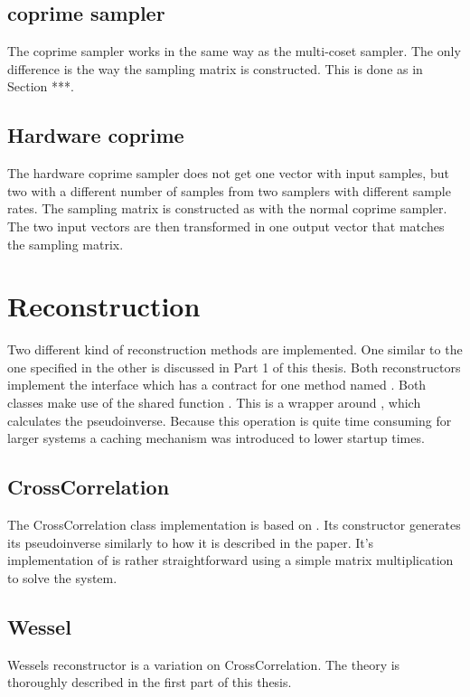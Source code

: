 \documentclass[a4paper, openany, oneside]{memoir}
\begin{document}
\subsection{coprime sampler}
\label{sec:coprime-sampler}
The coprime sampler works in the same way as the multi-coset sampler. The only difference is the way the sampling matrix is constructed. This is done as in Section ***.

\subsection{Hardware coprime}
\label{sec:hardware-coprime}
The hardware coprime sampler does not get one vector with input samples, but two with a different number of samples from two samplers with different sample rates. The sampling matrix is constructed as with the normal coprime sampler. The two input vectors are then transformed in one output vector that matches the sampling matrix.

\section{Reconstruction}
\label{sec:reconstruction}
Two different kind of reconstruction methods are implemented. One similar to the one specified in \cite{ariananda2012compressive} the other is discussed in Part 1 of this thesis. Both reconstructors implement the interface  which has a contract for one method named . Both classes make use of the shared function . This is a wrapper around  , which calculates the pseudoinverse. Because this operation is quite time consuming for larger systems a caching mechanism was introduced to lower startup times.

\subsection{CrossCorrelation}
\label{sub:crosscorrelation}
The CrossCorrelation class implementation is based on \cite{ariananda2012compressive}. Its constructor generates its pseudoinverse similarly to how it is described in the paper. It's implementation of  is rather straightforward using a simple matrix multiplication to solve the system.

\subsection{Wessel}
\label{sub:wessel}
Wessels reconstructor is a variation on CrossCorrelation. The theory is thoroughly described in the first part of this thesis.
\end{document}
